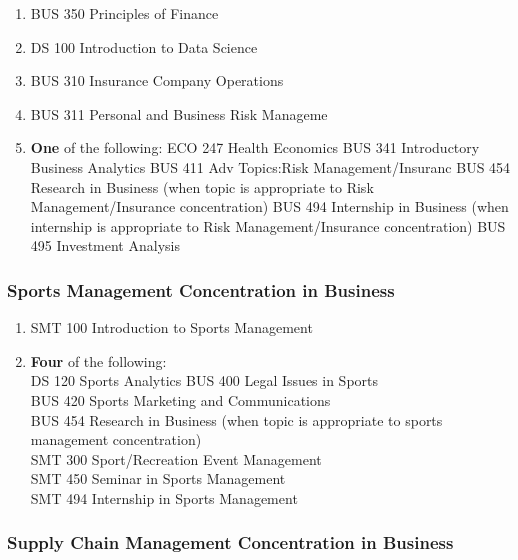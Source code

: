\documentclass[
  letterpaper,
]{scrbook}
\providecommand{\tightlist}{%
  \setlength{\itemsep}{0pt}\setlength{\parskip}{0pt}}
\begin{document}
\begin{enumerate}
\def\labelenumi{\arabic{enumi}.}
\tightlist
\item
  BUS 350 Principles of Finance
\item
  DS 100 Introduction to Data Science
\item
  BUS 310 Insurance Company Operations
\item
  BUS 311 Personal and Business Risk Manageme
\item
  \textbf{One} of the following: ECO 247 Health Economics BUS 341
  Introductory Business Analytics BUS 411 Adv Topics:Risk
  Management/Insuranc BUS 454 Research in Business (when topic is
  appropriate to Risk Management/Insurance concentration) BUS 494
  Internship in Business (when internship is appropriate to Risk
  Management/Insurance concentration) BUS 495 Investment Analysis
\end{enumerate}

\subsubsection{Sports Management Concentration in
Business}\label{sec-sports-management-concentration}

\begin{enumerate}
\def\labelenumi{\arabic{enumi}.}
\tightlist
\item
  SMT 100 Introduction to Sports Management\\
\item
  \textbf{Four} of the following:\\
  DS 120 Sports Analytics BUS 400 Legal Issues in Sports\\
  BUS 420 Sports Marketing and Communications\\
  BUS 454 Research in Business (when topic is appropriate to sports
  management concentration)\\
  SMT 300 Sport/Recreation Event Management\\
  SMT 450 Seminar in Sports Management\\
  SMT 494 Internship in Sports Management
\end{enumerate}

\subsubsection{Supply Chain Management Concentration in
Business}\label{supply-chain-management-concentration-in-business}
\end{document}
